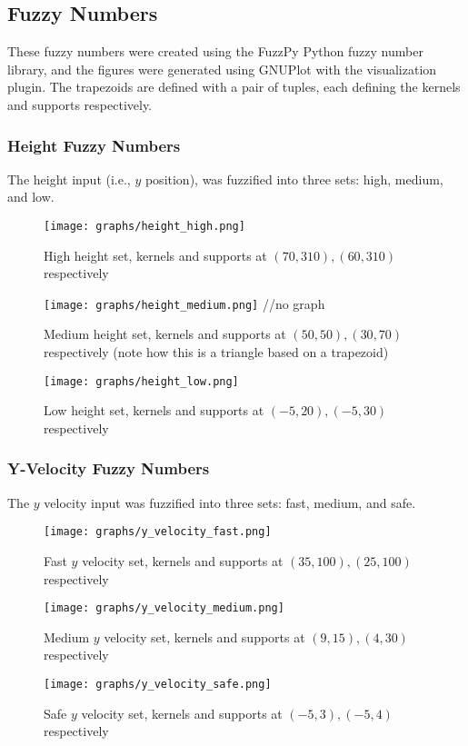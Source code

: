 \documentclass[12pt, article]{scrartcl}
\begin{document}
\subsection{Fuzzy Numbers}
These fuzzy numbers were created using the FuzzPy Python fuzzy number library, and the figures were generated using GNUPlot with the visualization plugin. The trapezoids are defined with a pair of tuples, each defining the kernels and supports respectively.

\subsubsection{Height Fuzzy Numbers}
The height input (i.e., $y$ position), was fuzzified into three sets: high, medium, and low.
\begin{figure}[h]
    \centering
    \caption{High height set, kernels and supports at $(70, 310), (60, 310)$ respectively}
    \texttt{[image: graphs/height\_high.png]}
\end{figure}
\begin{figure}[h]
    \centering
    \caption{Medium height set, kernels and supports at $(50, 50), (30, 70)$ respectively (note how this is a triangle based on a trapezoid)}
    \texttt{[image: graphs/height\_medium.png]} //no graph 
\end{figure}
\begin{figure}[h]
    \centering
    \caption{Low height set, kernels and supports at $(-5, 20), (-5, 30)$ respectively}
    \texttt{[image: graphs/height\_low.png]}
\end{figure}

\subsubsection{Y-Velocity Fuzzy Numbers}
The $y$ velocity input was fuzzified into three sets: fast, medium, and safe.
\begin{figure}[h]
    \centering
    \caption{Fast $y$ velocity set, kernels and supports at $(35, 100), (25, 100)$ respectively}
    \texttt{[image: graphs/y\_velocity\_fast.png]}
\end{figure}
\begin{figure}[h]
    \centering
    \caption{Medium $y$ velocity set, kernels and supports at $(9, 15), (4, 30)$ respectively}
    \texttt{[image: graphs/y\_velocity\_medium.png]}
\end{figure}
\begin{figure}[h]
    \centering
    \caption{Safe $y$ velocity set, kernels and supports at $(-5, 3), (-5, 4)$ respectively}
    \texttt{[image: graphs/y\_velocity\_safe.png]}
\end{figure}
\end{document}
